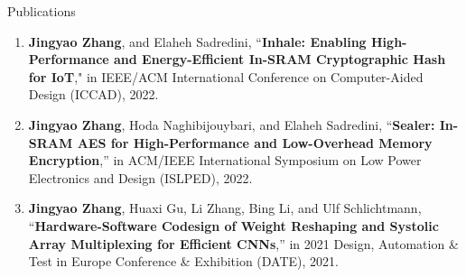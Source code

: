 \documentclass{resume} %
\begin{document}
\begin{rSection}{Publications}
\begin{enumerate}
    \item \textbf{Jingyao Zhang}, and Elaheh Sadredini, ``\textbf{Inhale: Enabling High-Performance and Energy-Efficient In-SRAM Cryptographic Hash for IoT}," in IEEE/ACM International Conference on Computer-Aided Design (ICCAD), 2022.
    \item \textbf{Jingyao Zhang}, Hoda Naghibijouybari, and Elaheh Sadredini, ``\textbf{Sealer: In-SRAM AES for High-Performance and Low-Overhead Memory Encryption},” in ACM/IEEE International Symposium on Low Power Electronics and Design (ISLPED), 2022.
    \item \textbf{Jingyao Zhang}, Huaxi Gu, Li Zhang, Bing Li, and Ulf Schlichtmann, “\textbf{Hardware-Software Codesign of Weight Reshaping and Systolic Array Multiplexing for Efficient CNNs},” in 2021 Design, Automation \& Test in Europe Conference \& Exhibition (DATE), 2021.
\end{enumerate}




\end{rSection}

\end{document}
